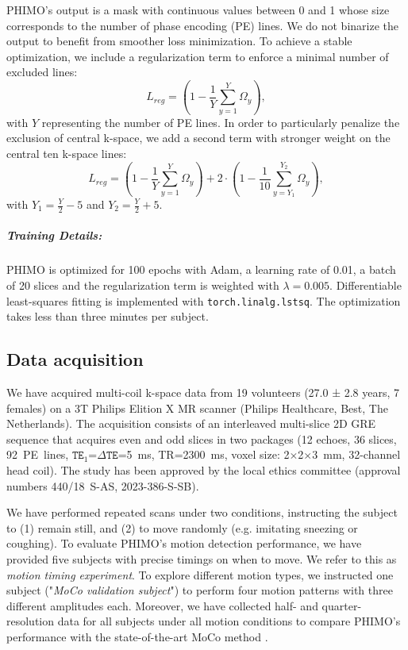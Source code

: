 \documentclass[AMA,STIX2COL]{MRM}
\begin{document}
PHIMO's output is a mask with continuous values between 0 and 1 whose size corresponds to the number of phase encoding (PE) lines. We do not binarize the output to benefit from smoother loss minimization. 
To achieve a stable optimization, we include a regularization term to enforce a minimal number of excluded lines:
%
\begin{equation}
     L_{reg} = (1- \frac{1}{Y}\sum_{y=1}^{Y} \Omega_{y}),
\end{equation}
with $Y$ representing the number of PE lines. 
In order to particularly penalize the exclusion of central k-space, we add a second term with stronger weight on the central ten k-space lines:
%
\begin{equation}
     L_{reg} = (1- \frac{1}{Y}\sum_{y=1}^{Y} \Omega_{y}) + 2 \cdot (1-\frac{1}{10} \sum_{y=Y_1}^{Y_2} \Omega_{y}), 
\end{equation}
%
with  $Y_1=\frac{Y}{2}-5$ and $Y_2=\frac{Y}{2}+5$. 


\subparagraph{Training Details:}
PHIMO is optimized for 100 epochs with Adam,\cite{Adam_2015} a learning rate of 0.01, a batch of 20 slices and the regularization term is weighted with $\lambda = 0.005$. Differentiable least-squares fitting is implemented with \texttt{torch.linalg.lstsq}. The optimization takes less than three minutes per subject. 


\subsection{Data acquisition} \label{sec:methods:data}
We have acquired multi-coil k-space data from 19 volunteers (27.0 ± 2.8 years, 7 females) on a 3T Philips Elition X MR scanner (Philips Healthcare, Best, The Netherlands). The acquisition consists of an interleaved multi-slice 2D GRE sequence that acquires even and odd slices in two packages
(12 echoes, 36 slices, 92~PE~lines, $\mathtt{TE}_1$=$\Delta\mathtt{TE}$=5~ms, TR=2300~ms, voxel size: 2$\times$2$\times$3~mm, 32-channel head coil). 
The study has been approved by the local ethics committee (approval numbers \mbox{440/18 S-AS}, \mbox{2023-386-S-SB}). 

We have performed repeated scans under two conditions, instructing the subject to (1) remain still, and (2) to move randomly (e.g. imitating sneezing or coughing). To evaluate PHIMO's motion detection performance, we have provided five subjects with precise timings on when to move. We refer to this as \textit{motion timing experiment}. To explore different motion types, we instructed one subject ("\textit{MoCo validation subject}") to perform four motion patterns with three different amplitudes each. 
Moreover, we have collected half- and quarter-resolution data for all subjects under all motion conditions to compare PHIMO's performance with the state-of-the-art MoCo method \cite{Noth_2014}. 
\end{document}
